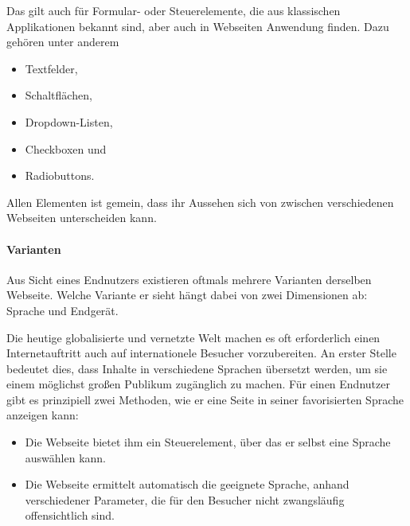             Das gilt auch für Formular- oder Steuerelemente,
            die aus klassischen Applikationen bekannt sind,
            aber auch in Webseiten Anwendung finden.
            Dazu gehören unter anderem

            \begin{itemize}
                \item Textfelder,
                \item Schaltflächen,
                \item Dropdown-Listen,
                \item Checkboxen und
                \item Radiobuttons.
            \end{itemize}

            Allen Elementen ist gemein, dass ihr Aussehen sich von
            zwischen verschiedenen Webseiten unterscheiden kann.

            \paragraph{Varianten}
            Aus Sicht eines Endnutzers existieren oftmals mehrere
            Varianten derselben Webseite.
            Welche Variante er sieht hängt dabei von zwei Dimensionen ab:
            Sprache und Endgerät.

            Die heutige globalisierte und vernetzte Welt machen es oft erforderlich
            einen Internetauftritt auch auf internationele Besucher vorzubereiten.
            An erster Stelle bedeutet dies, dass Inhalte in verschiedene Sprachen
            übersetzt werden, um sie einem möglichst großen Publikum zugänglich zu machen.
            Für einen Endnutzer gibt es prinzipiell zwei Methoden,
            wie er eine Seite in seiner favorisierten Sprache anzeigen kann:

            \begin{itemize}
                \item   Die Webseite bietet ihm ein Steuerelement,
                        über das er selbst eine Sprache auswählen kann.
                \item   Die Webseite ermittelt automatisch die geeignete Sprache,
                        anhand verschiedener Parameter, die für den Besucher nicht zwangsläufig
                        offensichtlich sind.
            \end{itemize}

